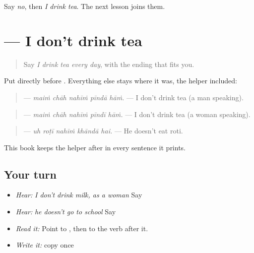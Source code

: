 \begin{tcolorbox}[breakable,colback=teal!4,colframe=teal!35!black,title={Before you move on}]
Say \emph{no}, then \emph{I drink tea}. The next lesson joins them.
\end{tcolorbox}
\section[\texorpdfstring{\pa{ਮੈਂ} \pa{ਚਾਹ} \pa{ਨਹੀਂ} \pa{ਪੀਂਦਾ} \pa{ਹਾਂ।} (maiṁ chāh nahīṁ …)}{ਮੈਂ ਚਾਹ ਨਹੀਂ ਪੀਂਦਾ ਹਾਂ। (maiṁ chāh nahīṁ …)}]{     — I don't drink tea}

\label{lesson:PA-C212-nahin-pinda}



\begin{quote}
Say \emph{I drink tea every day}, with the ending that fits you.
\end{quote}

\begin{grammarlens}[title={Grammar Lens: \pa{ਨਹੀਂ} before the verb}]
Put \textbf{} directly before \textbf{}. Everything else stays where it was, the helper \textbf{} included:

\begin{quote}
\textbf{    } — \emph{maiṁ chāh nahīṁ pīndā hāṁ.} — I don't drink tea (a man speaking).
\end{quote}

\begin{quote}
\textbf{    } — \emph{maiṁ chāh nahīṁ pīndī hāṁ.} — I don't drink tea (a woman speaking).
\end{quote}

\begin{quote}
\textbf{    } — \emph{uh roṭī nahīṁ khāndā hai.} — He doesn't eat roti.
\end{quote}

This book keeps the helper after \textbf{} in every sentence it prints.
\end{grammarlens}

\subsection*{Your turn}
\begin{itemize}
\raggedright
  \item \emph{Hear:} \emph{I don't drink milk, as a woman} Say \textbf{    }
  \item \emph{Hear:} \emph{he doesn't go to school} Say \textbf{    }
  \item \emph{Read it:} \textbf{    } Point to \textbf{}, then to the verb after it.
  \item \emph{Write it:} copy \textbf{  } once
\end{itemize}

